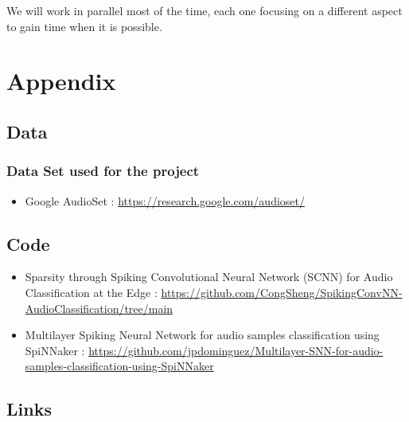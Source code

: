\documentclass[11pt]{article}
\begin{document}
We will work in parallel most of the time, each one focusing on a different aspect to gain time when it is possible.

\pagebreak

\section{Appendix}

\subsection{Data}

\subsubsection*{Data Set used for the project}

\begin{itemize}
  \item Google AudioSet : \url{https://research.google.com/audioset/}
        \label{item:google-audioset}

\end{itemize}



\subsection{Code}

\begin{itemize}
  \item Sparsity through Spiking Convolutional Neural Network (SCNN) for Audio Classification at the Edge : \url{https://github.com/CongSheng/SpikingConvNN-AudioClassification/tree/main}
        \label{item:SCNN-audio-classification}
  \item Multilayer Spiking Neural Network for audio samples classification using SpiNNaker : \url{https://github.com/jpdominguez/Multilayer-SNN-for-audio-samples-classification-using-SpiNNaker}
        \label{item:spinnaker-audio-classification}

\end{itemize}

\subsection{Links}

\pagebreak



\end{document}
